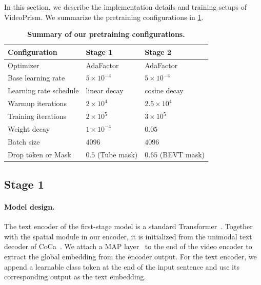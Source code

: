 \documentclass{article}
\theoremstyle{plain}
\theoremstyle{definition}
\theoremstyle{remark}
\newcommand{\OURS}{VideoPrism\xspace}
\begin{document}
In this section, we describe the implementation details and training setups of \OURS. We summarize the pretraining configurations in \cref{tab:pretrain_config}.

\begin{table}[t]
    \caption{\textbf{Summary of our pretraining configurations.}}
	\label{tab:pretrain_config}
	\vskip 0.1in
	\begin{center}
\begin{scriptsize}
    \begin{tabular}	{@{}l|ll@{}}
        \toprule
        Configuration & Stage 1 & Stage 2 \\
        \midrule
Optimizer & AdaFactor & AdaFactor \\
        Base learning rate & $5\times 10^{-4}$ & $5\times 10^{-4}$\\
        Learning rate schedule & linear decay & cosine decay \\
        Warmup iterations & $2\times 10^4$ & $2.5 \times10^{4} $ \\
        Training iterations & $2\times 10^5$ & $3\times 10^5$ \\
        Weight decay & $1\times 10^{-4}$ & $0.05$ \\
        Batch size & $4096$ & $4096$ \\
        Drop token or Mask & $0.5$ (Tube mask) & $0.65$ (BEVT mask)\\
        \bottomrule
		\end{tabular}
		\end{scriptsize}
\end{center}
	\vskip -0.1in
\end{table}

\subsection{Stage 1}
\label{sec:appendix:impl:stage1}

\paragraph{Model design.} The text encoder of the first-stage model is a standard Transformer~\cite{vaswani2017attention}. Together with the spatial module in our encoder, it is initialized from the unimodal text decoder of CoCa~\cite{yu2022coca}. We attach a MAP layer~\cite{lee2019set,yu2022coca} to the end of the video encoder to extract the global embedding from the encoder output. For the text encoder, we append a learnable class token at the end of the input sentence and use its corresponding output as the text embedding. 
\end{document}
